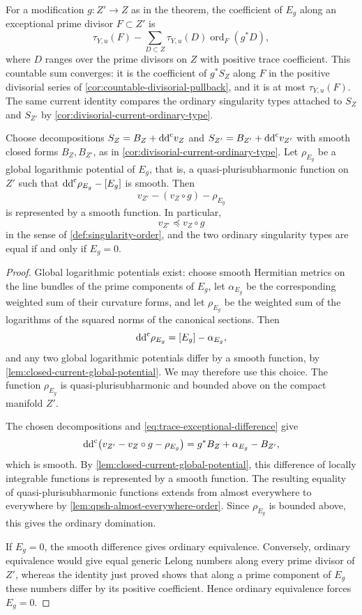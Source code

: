 For a modification $g\colon Z'\to Z$ as in the theorem, the coefficient of $E_g$ along an exceptional prime divisor $F\subset Z'$ is
\begin{equation}\label{eq:trace-exceptional-coefficient}
 \tau_{Y,u}(F)
  -\sum_{D\subset Z}\tau_{Y,u}(D)\operatorname{ord}_F(g^*D),
\end{equation}
where $D$ ranges over the prime divisors on $Z$ with positive trace coefficient. This countable sum converges: it is the coefficient of $g^*S_Z$ along $F$ in the positive divisorial series of \cref{cor:countable-divisorial-pullback}, and it is at most $\tau_{Y,u}(F)$. The same current identity compares the ordinary singularity types attached to $S_Z$ and $S_{Z'}$ by \cref{cor:divisorial-current-ordinary-type}.

\begin{corollary}\label{cor:trace-model-ordinary-comparison}
Choose decompositions $S_Z=B_Z+\mathrm{dd}^{\mathrm{c}} v_Z$ and $S_{Z'}=B_{Z'}+\mathrm{dd}^{\mathrm{c}} v_{Z'}$ with smooth closed forms $B_Z,B_{Z'}$, as in \cref{cor:divisorial-current-ordinary-type}. Let $\rho_{E_g}$ be a global logarithmic potential of $E_g$, that is, a quasi-plurisubharmonic function on $Z'$ such that $\mathrm{dd}^{\mathrm{c}}\rho_{E_g}-[E_g]$ is smooth. Then
\[
 v_{Z'}-(v_Z\circ g)-\rho_{E_g}
\]
is represented by a smooth function. In particular,
\[
 v_{Z'}\preceq v_Z\circ g
\]
in the sense of \cref{def:singularity-order}, and the two ordinary singularity types are equal if and only if $E_g=0$.
\end{corollary}
\begin{proof}
Global logarithmic potentials exist: choose smooth Hermitian metrics on the line bundles of the prime components of $E_g$, let $\alpha_{E_g}$ be the corresponding weighted sum of their curvature forms, and let $\rho_{E_g}$ be the weighted sum of the logarithms of the squared norms of the canonical sections. Then
\[
 \mathrm{dd}^{\mathrm{c}}\rho_{E_g}=[E_g]-\alpha_{E_g},
\]
and any two global logarithmic potentials differ by a smooth function, by \cref{lem:closed-current-global-potential}. We may therefore use this choice. The function $\rho_{E_g}$ is quasi-plurisubharmonic and bounded above on the compact manifold $Z'$.

The chosen decompositions and \eqref{eq:trace-exceptional-difference} give
\[
 \mathrm{dd}^{\mathrm{c}}\bigl(v_{Z'}-v_Z\circ g-\rho_{E_g}\bigr)
       =g^*B_Z+\alpha_{E_g}-B_{Z'},
\]
which is smooth. By \cref{lem:closed-current-global-potential}, this difference of locally integrable functions is represented by a smooth function. The resulting equality of quasi-plurisubharmonic functions extends from almost everywhere to everywhere by \cref{lem:qpsh-almost-everywhere-order}. Since $\rho_{E_g}$ is bounded above, this gives the ordinary domination.

If $E_g=0$, the smooth difference gives ordinary equivalence. Conversely, ordinary equivalence would give equal generic Lelong numbers along every prime divisor of $Z'$, whereas the identity just proved shows that along a prime component of $E_g$ these numbers differ by its positive coefficient. Hence ordinary equivalence forces $E_g=0$.
\end{proof}

